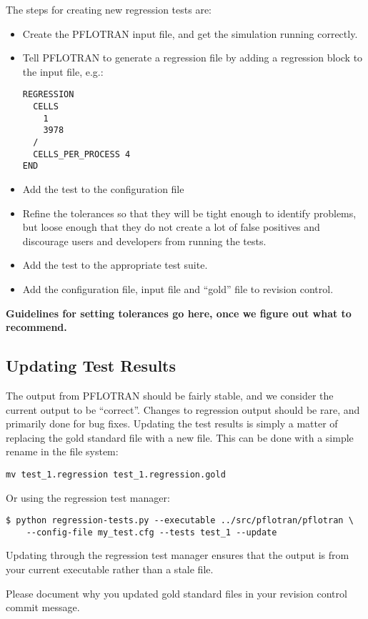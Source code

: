The steps for creating new regression tests are:
\begin{itemize}
\item Create the PFLOTRAN input file, and get the simulation running
  correctly.

\item Tell PFLOTRAN to generate a regression file by adding a
  regression block to the input file, e.g.:
\begin{verbatim}
REGRESSION
  CELLS 
    1
    3978
  /
  CELLS_PER_PROCESS 4
END
\end{verbatim}

\item Add the test to the configuration file

\item Refine the tolerances so that they will be tight enough to
  identify problems, but loose enough that they do not create a lot of
  false positives and discourage users and developers from running the
  tests.

\item Add the test to the appropriate test suite.

\item Add the configuration file, input file and ``gold'' file to revision control.

\end{itemize}

\textbf{Guidelines for setting tolerances go here, once we figure out what to recommend.}

\subsection{Updating Test Results}

The output from PFLOTRAN should be fairly stable, and we consider the
current output to be ``correct''. Changes to regression output should
be rare, and primarily done for bug fixes. Updating the test results
is simply a matter of replacing the gold standard file with a new
file. This can be done with a simple rename in the file system:
\begin{verbatim}
mv test_1.regression test_1.regression.gold
\end{verbatim}
Or using the regression test manager:
\begin{verbatim}
$ python regression-tests.py --executable ../src/pflotran/pflotran \
    --config-file my_test.cfg --tests test_1 --update
\end{verbatim}
Updating through the regression test manager ensures that the output
is from your current executable rather than a stale file.

Please document why you updated gold standard files in
your revision control commit message.
